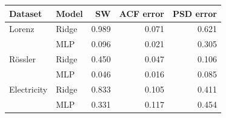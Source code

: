 \begin{tabular}{llrrr}
\toprule
Dataset & Model & SW & ACF error & PSD error \\
\midrule
Lorenz & Ridge & 0.989 & 0.071 & 0.621 \\
 & MLP & 0.096 & 0.021 & 0.305 \\
R\"ossler & Ridge & 0.450 & 0.047 & 0.106 \\
 & MLP & 0.046 & 0.016 & 0.085 \\
Electricity & Ridge & 0.833 & 0.105 & 0.411 \\
 & MLP & 0.331 & 0.117 & 0.454 \\
\bottomrule
\end{tabular}
